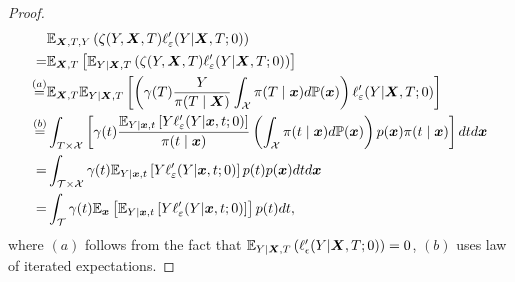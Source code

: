\begin{proof}
\begin{equation}\label{appendix_eq:EIF_RHS1}
\begin{split}
& \mathbb{E}_{\boldsymbol{X},T,Y}\left(\zeta(Y,\boldsymbol{X},T)\ell'_{\varepsilon}(Y|\boldsymbol{X},T;0)\right)\\
=&\mathbb{E}_{\boldsymbol{X},T}\left[\mathbb{E}_{Y|\boldsymbol{X},T}\left(\zeta(Y,\boldsymbol{X},T)\ell'_{\varepsilon}(Y|\boldsymbol{X},T;0)\right)\right]\\
\stackrel{(a)}{=} & \mathbb{E}_{\boldsymbol{X},T}\mathbb{E}_{Y|\boldsymbol{X},T}\left[\left(\gamma(T)\frac{Y}{\pi(T\mid\boldsymbol{X})}\int_{\mathcal{X}}\pi(T\mid\boldsymbol{x})d\mathbb{P}(\boldsymbol{x})\right)\ell'_{\varepsilon}(Y|\boldsymbol{X},T;0)\right]\\
\stackrel{(b)}{=} & \int_{T\times\mathcal{X}}\left[\gamma(t)\frac{\mathbb{E}_{Y|\boldsymbol{x},t}\left[Y\ell'_{\varepsilon}(Y|\boldsymbol{x},t;0)\right]}{\pi(t\mid\boldsymbol{x})}\left(\int_{\mathcal{X}}\pi(t\mid\boldsymbol{x})d\mathbb{P}(\boldsymbol{x})\right)p(\boldsymbol{x})\pi(t\mid\boldsymbol{x})\right]dtd\boldsymbol{x}\\
\stackrel{}{=} & \int_{\mathcal{\mathcal{T\times\mathcal{X}}}}\gamma(t)\mathbb{E}_{Y|\boldsymbol{x},t}\left[Y\ell'_{\varepsilon}(Y|\boldsymbol{x},t;0)\right]p(t)p(\boldsymbol{x})dtd\boldsymbol{x}\\
\stackrel{}{=} & \int_{\mathcal{\mathcal{T}}}\gamma(t)\mathbb{E}_{\boldsymbol{x}}\left[\mathbb{E}_{Y|\boldsymbol{x},t}\left[Y\ell'_{\varepsilon}(Y|\boldsymbol{x},t;0)\right]\right]p(t)dt,
\end{split}
\end{equation}
where $(a)$ follows from the fact that $\mathbb{E}_{Y|\boldsymbol{X},T}\left(\ell'_{\epsilon}(Y|\boldsymbol{X},T;0)\right)=0$,
$(b)$ uses law of iterated expectations.


\end{proof}

